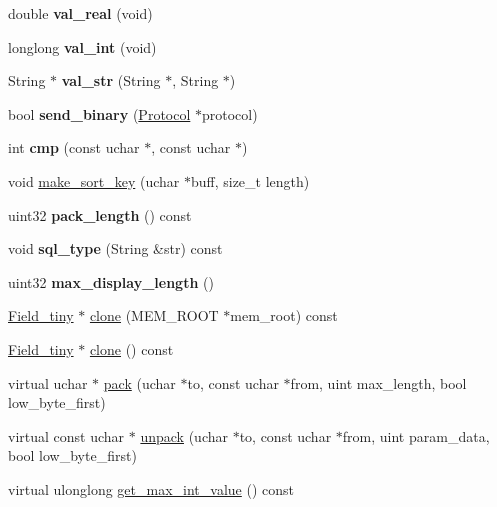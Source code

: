 \begin{DoxyCompactItemize}
double {\bfseries val\+\_\+real} (void)
\item 
\mbox{\label{classField__tiny_a0bc6f7c668383fab0e4dbedf2c4f1488}} 
longlong {\bfseries val\+\_\+int} (void)
\item 
\mbox{\label{classField__tiny_a253382620a0e0ea14123efe1e711e9e1}} 
String $\ast$ {\bfseries val\+\_\+str} (String $\ast$, String $\ast$)
\item 
\mbox{\label{classField__tiny_a634966c505b2c969424323aa3974d97e}} 
bool {\bfseries send\+\_\+binary} (\mbox{\hyperlink{classProtocol}{Protocol}} $\ast$protocol)
\item 
\mbox{\label{classField__tiny_a7c01dbf7645960e2d87e9bf7b2fc90b4}} 
int {\bfseries cmp} (const uchar $\ast$, const uchar $\ast$)
\item 
void \mbox{\hyperlink{classField__tiny_aed9f16f6c316ed9335f9b09febfce864}{make\+\_\+sort\+\_\+key}} (uchar $\ast$buff, size\+\_\+t length)
\item 
\mbox{\label{classField__tiny_aedfd408b4bfec4757ee36470aa5f61c8}} 
uint32 {\bfseries pack\+\_\+length} () const
\item 
\mbox{\label{classField__tiny_a32f38832572f95367bbcb4b76651129c}} 
void {\bfseries sql\+\_\+type} (String \&str) const
\item 
\mbox{\label{classField__tiny_afb470dcce766cba9be2fde69921ac1ff}} 
uint32 {\bfseries max\+\_\+display\+\_\+length} ()
\item 
\mbox{\hyperlink{classField__tiny}{Field\+\_\+tiny}} $\ast$ \mbox{\hyperlink{classField__tiny_acbaf0f92950a7291a622f8c99b40adc9}{clone}} (M\+E\+M\+\_\+\+R\+O\+OT $\ast$mem\+\_\+root) const
\item 
\mbox{\hyperlink{classField__tiny}{Field\+\_\+tiny}} $\ast$ \mbox{\hyperlink{classField__tiny_a93e167fcbd0814d8b0f03884c5f02887}{clone}} () const
\item 
virtual uchar $\ast$ \mbox{\hyperlink{classField__tiny_ac3326a980428d393cd52d821578f87d7}{pack}} (uchar $\ast$to, const uchar $\ast$from, uint max\+\_\+length, bool low\+\_\+byte\+\_\+first)
\item 
virtual const uchar $\ast$ \mbox{\hyperlink{classField__tiny_a1be4d9de39cf9efe57b276614f8f1bf9}{unpack}} (uchar $\ast$to, const uchar $\ast$from, uint param\+\_\+data, bool low\+\_\+byte\+\_\+first)
\item 
virtual ulonglong \mbox{\hyperlink{classField__tiny_af359459fc3d3a2994dfb48f598ec553b}{get\+\_\+max\+\_\+int\+\_\+value}} () const
\end{DoxyCompactItemize}
